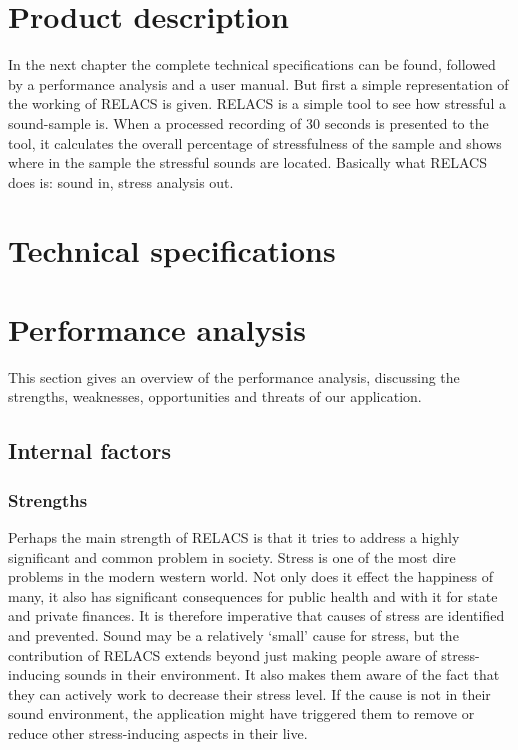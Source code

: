 \documentclass[a4paper]{article}
\begin{document}
\section{Product description}
In the next chapter the complete technical specifications can be found, followed by a performance analysis and a user manual. 
But first a simple representation of the working of RELACS is given. RELACS is a simple tool to see how stressful a sound-sample is. 
When a processed recording of 30 seconds is presented to the tool, it calculates the overall percentage of stressfulness of the sample and shows where in the sample the stressful sounds are located. 
Basically what RELACS does is: sound in, stress analysis out.

\section{Technical specifications}


\section{Performance analysis}
This section gives an overview of the performance analysis, discussing the strengths, weaknesses, opportunities and threats of our application.

\subsection{Internal factors}
\subsubsection{Strengths}
Perhaps the main strength of RELACS is that it tries to address a highly significant and common problem in society.
Stress is one of the most dire problems in the modern western world.
Not only does it effect the happiness of many, it also has significant consequences for public health and with it for state and private finances.
It is therefore imperative that causes of stress are identified and prevented.
Sound may be a relatively `small' cause for stress, but the contribution of RELACS extends beyond just making people aware of stress-inducing sounds in their environment.
It also makes them aware of the fact that they can actively work to decrease their stress level.
If the cause is not in their sound environment, the application might have triggered them to remove or reduce other stress-inducing aspects in their live.
\end{document}
